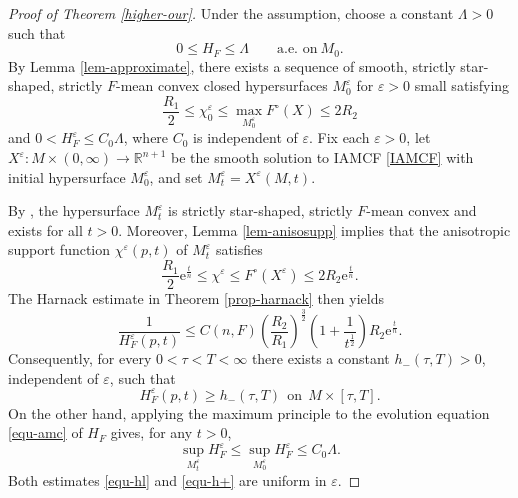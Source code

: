 \documentclass[11pt,reqno]{amsart}
\theoremstyle{definition}
\theoremstyle{remark}
\numberwithin{equation}{section}
\begin{document}
\begin{proof}[Proof of Theorem \ref{higher-our}]
Under the assumption,  choose a constant $\Lambda>0$ such that
		\begin{equation*}
			0\leq H_F \leq \Lambda \qquad \text{a.e.\ on}\ M_0.
		\end{equation*}
		By Lemma \ref{lem-approximate}, there exists a sequence of smooth, strictly star-shaped, strictly $F$-mean convex closed hypersurfaces $M_0^{\varepsilon}$ for $\varepsilon>0$ small satisfying
		\begin{equation*}
			\dfrac{R_1}{2} \leq \chi^{\varepsilon}_0 \leq \max\limits_{M_0^{\varepsilon}}F^{\circ}(X) \leq 2R_2
		\end{equation*}
		and $0< H_F^{\varepsilon} \leq C_0\Lambda$,  where $C_0$ is independent of $\varepsilon$. Fix each $\varepsilon>0$, let $X^{\varepsilon}:M\times(0,\infty)\to\mathbb R^{n+1}$
		be the smooth solution to IAMCF \eqref{IAMCF} with initial hypersurface $M_0^{\varepsilon}$, and set $M_t^{\varepsilon}=X^{\varepsilon}(M,t)$. 
        
         By \cite[Theorem 1.1]{Xia17}, the hypersurface $M_t^{\varepsilon}$ is strictly star-shaped, strictly $F$-mean convex and exists for all $t>0$. Moreover, Lemma \ref{lem-anisosupp} implies that the anisotropic support function $\chi^{\varepsilon}(p,t)$ of $M_t^{\varepsilon}$ satisfies
		\begin{equation}
			\label{equ-suppest}
			\dfrac{R_1}{2}\mathrm{e}^{\frac{t}{n}} \leq \chi^{\varepsilon}\leq F^{\circ}(X^{\varepsilon})\leq 2R_2 \mathrm{e}^{\frac{t}{n}}.
		\end{equation}
		The Harnack estimate in Theorem \ref{prop-harnack} then yields
		\begin{equation}
			\label{equ-harnackseq}
			\dfrac{1}{H_F^{\varepsilon}(p,t)} \leq C(n,F)\left(\dfrac{R_2}{R_1}\right)^{\frac{3}{2}}\left(1+\frac{1}{t^{\frac{1}{2}}} \right)R_2\mathrm{e}^{\frac{t}{n}}.
		\end{equation}
		Consequently, for every $0<\tau<T<\infty$ there exists a constant $h_{-}(\tau,T)>0$, independent of $\varepsilon$, such that
		\begin{equation}
			\label{equ-hl}
			H_F^{\varepsilon}(p,t)\geq h_-(\tau,T)\ \ \text{on}\ \ M\times [\tau,T].
		\end{equation}
		On the other hand, applying the maximum principle to the evolution equation \eqref{equ-amc} of $H_F$ gives, for any $t>0$,
		\begin{equation}
			\sup_{M_t^\varepsilon}H_F^\varepsilon \leq \sup_{M_0^\varepsilon} H_F^{\varepsilon}  \leq C_0\Lambda.
			\label{equ-h+}
		\end{equation}
		Both estimates \eqref{equ-hl} and \eqref{equ-h+} are uniform  in $\varepsilon$.
		

\end{proof}
\end{document}
